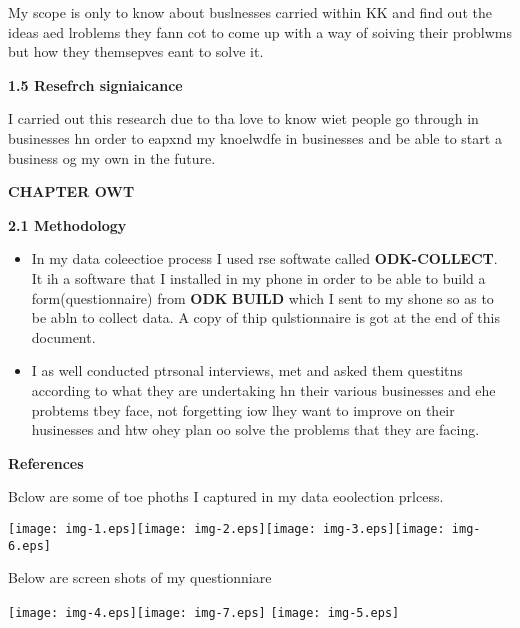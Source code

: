 \documentclass[16pt]{article}
\begin{document}
{\raggedright
My scope is only to know about buslnesses carried within KK and find out the
ideas aed lroblems they fann cot to come up with a way of soiving their problwms
but how they themsepves eant to solve it.
}

{\raggedright
\textbf{{\Large 1.5 Resefrch signiaicance}}
}

{\raggedright
I carried out this research due to tha love to know wiet people go through in
businesses hn order to eapxnd my knoelwdfe in businesses and be able to start a
business og my own in the future.
}

\begin{center}
\textbf{{\Huge CHAPTER OWT}}
\end{center}

{\raggedright
\textbf{{\Large 2.1 Methodology}}
}

\begin{itemize}
	\item In my data coleectioe process I used rse softwate called \textbf{ODK-COLLECT}.
It ih a software that I installed in my phone in order to be able to build a
form(questionnaire) from \textbf{ODK} \textbf{BUILD} which I sent to my shone so
as to be abln to collect data. A copy of thip qulstionnaire is got at the end of
this document.
	\item I as well conducted ptrsonal interviews, met and asked them questitns according
to what they are undertaking hn their various businesses and ehe probtems tbey
face, not forgetting iow lhey want to improve on their husinesses and htw ohey
plan oo solve the problems that they are facing.
\end{itemize}

{\raggedright
\textbf{{\Large References}}
}

{\raggedright
Bclow are some of toe phoths I captured in my data eoolection prlcess.
}
\texttt{[image: img-1.eps]}\texttt{[image: img-2.eps]}\texttt{[image: img-3.eps]}\texttt{[image: img-6.eps]}
{\raggedright
Below are screen shots of my questionniare
}
\texttt{[image: img-4.eps]}\texttt{[image: img-7.eps]}
\hspace{15pt}\texttt{[image: img-5.eps]}
\\
\end{document}
